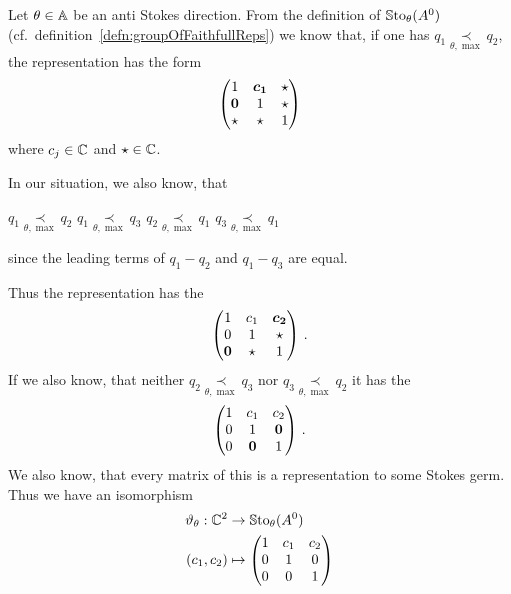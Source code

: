 \begin{exmp}
  Let $\theta\in\mathbb{A}$ be an anti Stokes direction.
  From the definition of $\operatorname{\mathbb{S}to}_\theta(A^0)$ (cf.\
  definition~\ref{defn:groupOfFaithfullReps}) we know that, if one has $q_1
  \underset{\theta,\max}{\prec} q_2$, the representation has the form
  \[
    \begin{pmatrix}
      1 & \text{\boldmath$c_1$} & \star
    \\\text{\boldmath$0$} & 1 & \star
    \\\star & \star & 1
    \end{pmatrix}
  \]
  where $c_j\in\mathbb{C}$ and $\star\in\mathbb{C}$.
  \begin{s-rem}
    In our situation, we also know, that
    \begin{einr}
      $q_1 \underset{\theta,\max}{\prec} q_2$
      \Leftrightarrow{}
      $q_1 \underset{\theta,\max}{\prec} q_3$
      \qquad {} \qquad
      $q_2 \underset{\theta,\max}{\prec} q_1$
      \Leftrightarrow{}
      $q_3 \underset{\theta,\max}{\prec} q_1$
    \end{einr}
    since the leading terms of $q_1-q_2$ and $q_1-q_3$ are equal.
  \end{s-rem}
  Thus the representation has the 
  \[
    \begin{pmatrix}
      1 & c_1 & \text{\boldmath$c_2$}
    \\0 & 1 & \star
    \\\text{\boldmath$0$} & \star & 1
    \end{pmatrix}\,.
  \]
  If we also know, that neither $q_2 \underset{\theta,\max}{\prec} q_3$ nor
  $q_3 \underset{\theta,\max}{\prec} q_2$ it has the \rewrite{form}
  \[
    \begin{pmatrix}
      1 & c_1 & c_2
    \\0 & 1 & \text{\boldmath$0$}
    \\0 & \text{\boldmath$0$} & 1
    \end{pmatrix}\,.
  \]
  We also know, that every matrix of this  is a representation to
  some Stokes germ.
  Thus we have an isomorphism
  \begin{align*}
    \vartheta_\theta:\mathbb{C}^2 &\to \operatorname{\mathbb{S}to}_\theta(A^0)
  \\(c_1,c_2)&\mapsto
    \begin{pmatrix}
      1 & c_1 & c_2
    \\0 & 1 & 0
    \\0 & 0 & 1
    \end{pmatrix}
  \end{align*}
\end{exmp}
